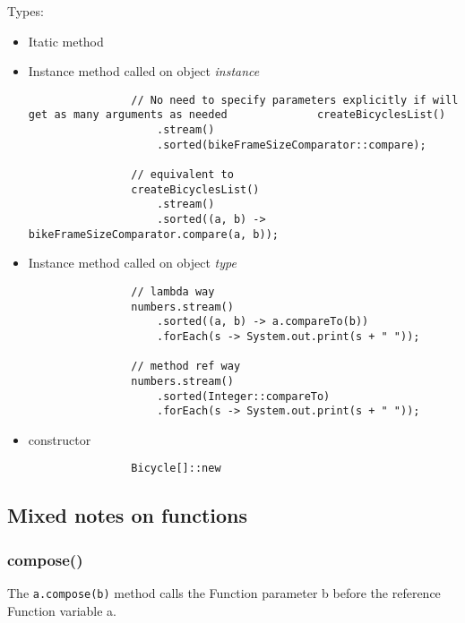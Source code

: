 \documentclass{scrartcl}
\begin{document}
    Types:
    \begin{itemize}
        \item Itatic method
        \item Instance method called on object \textit{instance}

            \begin{lstlisting}
                // No need to specify parameters explicitly if will get as many arguments as needed              createBicyclesList()
                    .stream()
                    .sorted(bikeFrameSizeComparator::compare);

                // equivalent to
                createBicyclesList()
                    .stream()
                    .sorted((a, b) -> bikeFrameSizeComparator.compare(a, b));
            \end{lstlisting}

        \item Instance method called on object \textit{type}

            \begin{lstlisting}
                // lambda way
                numbers.stream()
                    .sorted((a, b) -> a.compareTo(b))
                    .forEach(s -> System.out.print(s + " "));

                // method ref way
                numbers.stream()
                    .sorted(Integer::compareTo)
                    .forEach(s -> System.out.print(s + " "));
            \end{lstlisting}

        \item  constructor

            \begin{lstlisting}
                Bicycle[]::new
            \end{lstlisting}

    \end{itemize}

\subsection{Mixed notes on functions}
\subsubsection{compose()}

    The \lstinline{a.compose(b)} method calls the Function parameter b before the reference Function variable a.
\end{document}
